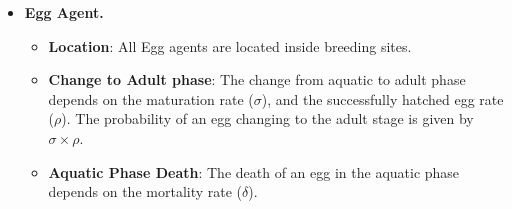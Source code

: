\begin{itemize}
	\item \textbf{Egg Agent.}
	      \begin{itemize}
		      \item \textbf{Location}: All Egg agents are located inside breeding sites.
		      \item \textbf{Change to  Adult phase}: The change from aquatic to adult
		            phase depends on the maturation rate ($\sigma$), and the successfully
		            hatched egg rate ($\rho$). The probability of an egg changing to the adult
		            stage is given by $\sigma \times \rho$.
		      \item \textbf{Aquatic Phase Death}: The death of an egg in the aquatic phase
		            depends on the mortality rate ($\delta$).
	      \end{itemize}


\end{itemize}
